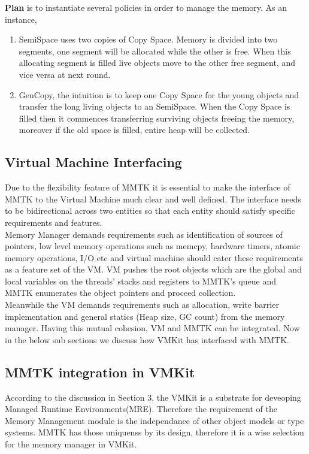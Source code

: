 \textbf{Plan} is to instantiate several policies in order to manage the memory. As an instance,
\begin{enumerate}
 \item SemiSpace uses two copies of Copy Space. Memory is divided into two segments, one segment will be allocated while the other is free. When this allocating segment is filled live objects move to the other free segment, and vice versa at next round.
 \item GenCopy, the intuition is to keep one Copy Space for the young objects and transfer the long living objects to an SemiSpace. When the Copy Space is filled then it commences transferring surviving objects freeing the memory, moreover if the old space is filled, entire heap will be collected.  
\end{enumerate}

\subsection{Virtual Machine Interfacing}
Due to the flexibility feature of MMTK it is essential to make the interface of MMTK to the Virtual Machine much clear and well defined. The interface needs to be bidirectional across two entities so that each entity should satisfy specific requirements and features.\\ 
Memory Manager demands requirements such as identification of sources of pointers, low level memory operations such as memcpy, hardware timers, atomic memory operations, I/O etc and virtual machine should cater these requirements as a feature set of the VM. VM pushes the root objects which are the global and local variables on the threads' stacks and registers to MMTK's queue and MMTK enumerates the object pointers and proceed collection.\\
Meanwhile the VM demands requirements such as allocation, write barrier implementation and general statics (Heap size, GC count) from the memory manager. Having this mutual cohesion, VM and MMTK can be integrated. Now in the below sub sections we discuss how VMKit has interfaced with MMTK.\\


\subsection{MMTK integration in VMKit}

According to the discussion in Section 3, the VMKit is a substrate for deveoping Managed Runtime Environments(MRE). Therefore the requirement of the Memory Management module is the independance of other object models or type systems. MMTK has those uniquenss by its design, therefore it is a wise selection for the memory manager in VMKit.\\


